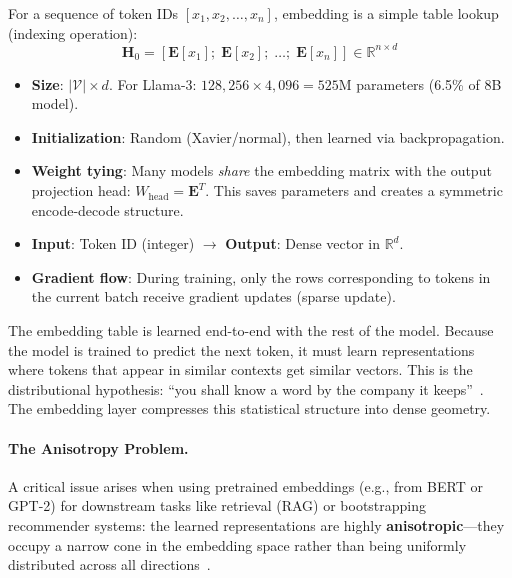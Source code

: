 For a sequence of token IDs $[x_1, x_2, \ldots, x_n]$, embedding is a simple table lookup (indexing operation): 
\[
\mathbf{H}_0 = [\mathbf{E}[x_1];\; \mathbf{E}[x_2];\; \ldots;\; \mathbf{E}[x_n]] \in \mathbb{R}^{n \times d}
\]

\begin{keybox}
\begin{itemize}
  \item \textbf{Size}: $|\mathcal{V}| \times d$. For Llama-3: $128{,}256 \times 4{,}096 = 525$M parameters (6.5\% of 8B model).
  \item \textbf{Initialization}: Random (Xavier/normal), then learned via backpropagation.
  \item \textbf{Weight tying}: Many models \emph{share} the embedding matrix with the output projection head: $W_{\text{head}} = \mathbf{E}^T$. This saves parameters and creates a symmetric encode-decode structure.
  \item \textbf{Input}: Token ID (integer) $\to$ \textbf{Output}: Dense vector in $\mathbb{R}^d$.
  \item \textbf{Gradient flow}: During training, only the rows corresponding to tokens in the current batch receive gradient updates (sparse update).
\end{itemize}
\end{keybox}

\begin{intuitionbox}
The embedding table is learned end-to-end with the rest of the model. Because the model is trained to predict the next token, it must learn representations where tokens that appear in similar contexts get similar vectors. This is the distributional hypothesis: ``you shall know a word by the company it keeps''~\cite{firth1957synopsis}. The embedding layer compresses this statistical structure into dense geometry.
\end{intuitionbox}

\paragraph{The Anisotropy Problem.}
\label{the-anisotropy-problem.}

A critical issue arises when using pretrained embeddings (e.g., from BERT or GPT-2) for downstream tasks like retrieval (RAG) or bootstrapping recommender systems: the learned representations are highly \textbf{anisotropic}---they occupy a narrow cone in the embedding space rather than being uniformly distributed across all directions~\cite{ethayarajh2019contextual}.

